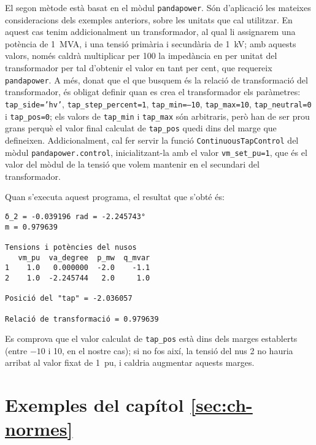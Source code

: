 El segon mètode està basat en el mòdul \texttt{pandapower}. Són d'aplicació les mateixes consideracions dels exemples anteriors, sobre les unitats que cal utilitzar. En aquest cas tenim addicionalment un transformador, al qual li assignarem una potència de \qty{1}{MVA}, i una tensió primària i secundària de \qty{1}{kV}; amb aquests valors, només caldrà multiplicar per 100 la impedància en per unitat  del transformador per tal d'obtenir el valor en tant per cent, que requereix \texttt{pandapower}. A més, donat que el que busquem és la relació de transformació del transformador, és obligat definir quan es crea el transformador els paràmetres: \texttt{tap\_side='hv'}, \texttt{tap\_step\_percent=1}, \texttt{tap\_min=--10}, \texttt{tap\_max=10}, \texttt{tap\_neutral=0} i  \texttt{tap\_pos=0}; els valors de \texttt{tap\_min} i \texttt{tap\_max} són arbitraris, però han de ser prou grans perquè el valor final calculat de \texttt{tap\_pos} quedi dins del marge que defineixen. Addicionalment, cal fer servir la funció \texttt{ContinuousTapControl} del mòdul \texttt{pandapower.control}, inicialitzant-la amb el valor \texttt{vm\_set\_pu=1}, que és el valor del mòdul de la tensió que volem mantenir en el secundari del transformador.


Quan s'executa aquest programa, el resultat que s'obté és:
\lstset{
	language=,
	numbers=none,
	frame=none
}
\begin{lstlisting}
δ_2 = -0.039196 rad = -2.245743°
m = 0.979639

Tensions i potències del nusos
   vm_pu  va_degree  p_mw  q_mvar
1    1.0   0.000000  -2.0    -1.1
2    1.0  -2.245744   2.0     1.0

Posició del "tap" = -2.036057

Relació de transformació = 0.979639
\end{lstlisting}

Es comprova que el valor calculat de \texttt{tap\_pos} està dins dels marges establerts (entre $-10$ i 10, en el nostre cas); si no fos així, la tensió del nus 2 no hauria arribat al valor fixat de \qty{1}{pu}, i caldria augmentar aquests marges.


\section{Exemples del capítol \ref*{sec:ch-normes}}

